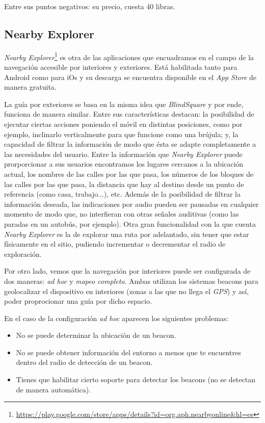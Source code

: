 \documentclass{article}
\begin{document}
	    Entre sus puntos negativos: su precio, cuesta 40 libras.
	
	\subsection{Nearby Explorer}
	    \textit{Nearby Explorer}\footnote{\url{https://play.google.com/store/apps/details?id=org.aph.nearbyonline&hl=es}} es otra de las aplicaciones que encuadramos en el campo de la navegación accesible por interiores y exteriores. Está habilitada tanto para Android como para iOs y su descarga se encuentra disponible en el \textit{App Store} de manera gratuita. 
	
	    La guía por exteriores se basa en la misma idea que \textit{BlindSquare} y por ende, funciona de manera similar. Entre sus características destacan: la posibilidad de ejecutar ciertas acciones poniendo el móvil en distintas posiciones, como por ejemplo, inclinarlo verticalmente para que funcione como una brújula; y, la capacidad de filtrar la información de modo que ésta se adapte completamente a las necesidades del usuario. Entre la información que \textit{Nearby Explorer} puede prorporcionar a sus usuarios encontramos los lugares cercanos a la ubicación actual, los nombres de las calles por las que pasa, los números de los bloques de las calles por las que pasa, la distancia que hay al destino desde un punto de referencia (como casa, trabajo...), etc. Además de la posibilidad de filtrar la información deseada, las indicaciones por audio pueden ser pausadas en cualquier momento de modo que, no interfieran con otras señales auditivas (como las paradas en un autobús, por ejemplo). Otra gran funcionalidad con la que cuenta \textit{Nearby Explorer} es la de explorar una ruta por adelantado, sin tener que estar físicamente en el sitio, pudiendo incrementar o decrementar el radio de exploración.
	
    	Por otro lado, vemos que la navegación por interiores puede ser configurada de dos maneras: \textit{ad hoc} y \textit{mapeo completo}. Ambas utilizan los sistemas beacons para geolocalizar el dispositivo en interiores (zonas a las que no llega el \textit{GPS}) y así, poder proprocionar una guía por dicho espacio.
	
	    En el caso de la configuración \textit{ad hoc} aparecen los siguientes problemas:
	    \begin{itemize}
		    \item No se puede determinar la ubicación de un beacon.
		    \item No se puede obtener información del entorno a menos que te encuentres dentro del radio de detección de un beacon.
		    \item Tienes que habilitar cierto soporte para detectar los beacons (no se detectan de manera automática).
	    \end{itemize}
\end{document}
